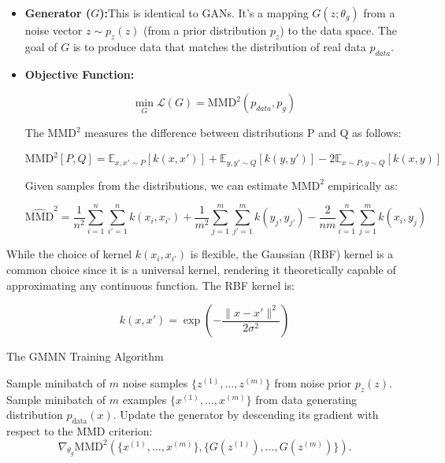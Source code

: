 \documentclass[12pt]{report}
\begin{document}
\begin{itemize}
\item \textbf{Generator ($G$):}This is identical to GANs. It's a mapping \( G(z; \theta_g)\) from a noise vector $z \sim p_z(z)$ (from a prior distribution $p_z$) to the data space. The goal of $G$ is to produce data that matches the distribution of real data $p_{data}$.

    \item \textbf{Objective Function:}

\begin{equation*}
\min_G \mathcal{L}(G) = \text{MMD}^2\left(p_{data}, p_g\right)
\end{equation*}

The $\text{MMD}^2$ measures the difference between distributions P and Q as follows: 

\begin{equation*}
\text{MMD}^2[P, Q] = \mathbb{E}_{x, x' \sim P}[k(x, x')] + \mathbb{E}_{y, y' \sim Q}[k(y, y')] - 2\mathbb{E}_{x \sim P, y \sim Q}[k(x, y)]
\end{equation*}

Given samples from the distributions, we can estimate $\text{MMD}^2$ empirically as: 

\begin{equation*}
\hat{\text{MMD}}^2 = \frac{1}{n^2} \sum_{i=1}^n \sum_{i'=1}^n k(x_i, x_{i'}) + \frac{1}{m^2} \sum_{j=1}^m \sum_{j'=1}^m k(y_j, y_{j'}) - \frac{2}{nm} \sum_{i=1}^n \sum_{j=1}^m k(x_i, y_j)
\end{equation*}

\end{itemize}
While the choice of kernel $k(x_i, x_{i'})$ is flexible, the Gaussian (RBF) kernel is a common choice since it is a universal kernel, rendering it theoretically capable of approximating any continuous function. The RBF kernel is: 

\begin{equation*}
k(x, x') = \exp\left(-\frac{\|x - x'\|^2}{2\sigma^2}\right)
\end{equation*}

\begin{algorithm}
\caption{The GMMN Training Algorithm}
\label{alg:gmmn_training}
\begin{algorithmic}
    \STATE Sample minibatch of \(m\) noise samples \(\{z^{(1)}, \ldots, z^{(m)}\}\) from noise prior \(p_z(z)\).
    \STATE Sample minibatch of \(m\) examples \(\{x^{(1)}, \ldots, x^{(m)}\}\) from data generating distribution \(p_{\text{data}}(x)\).
    \STATE Update the generator by descending its gradient with respect to the MMD criterion:
    \[
    \nabla_{\theta_g} \text{MMD}^2\left(\{x^{(1)}, \ldots, x^{(m)}\}, \{G(z^{(1)}), \ldots, G(z^{(m)})\}\right).
    \]
\ENDFOR
\end{algorithmic}
\end{algorithm}
\end{document}
